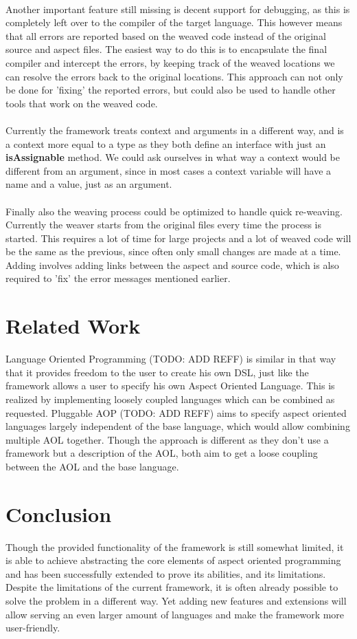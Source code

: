 \documentclass[a4paper]{report}
\begin{document}
\\
Another important feature still missing is decent support for debugging, as this is completely left over to the compiler of the target language. This however means that all errors are reported based on the weaved code instead of the original source and aspect files. The easiest way to do this is to encapsulate the final compiler and intercept the errors, by keeping track of the weaved locations we can resolve the errors back to the original locations. This approach can not only be done for 'fixing' the reported errors, but could also be used to handle other tools that work on the weaved code.\\
\\
Currently the framework treats context and arguments in a different way, and is a context more equal to a type as they both define an interface with just an \textbf{isAssignable} method. We could ask ourselves in what way a context would be different from an argument, since in most cases a context variable will have a name and a value, just as an argument.\\
\\
Finally also the weaving process could be optimized to handle quick re-weaving. Currently the weaver starts from the original files every time the process is started. This requires a lot of time for large projects and a lot of weaved code will be the same as the previous, since often only small changes are made at a time. Adding involves adding links between the aspect and source code, which is also required to 'fix' the error messages mentioned earlier.

\chapter{Related Work}
Language Oriented Programming (TODO: ADD REFF) is similar in that way that it provides freedom to the user to create his own DSL, just like the framework allows a user to specify his own Aspect Oriented Language. This is realized by implementing loosely coupled languages which can be combined as requested. Pluggable AOP (TODO: ADD REFF) aims to specify aspect oriented languages largely independent of the base language, which would allow combining multiple AOL together.  Though the approach is different as they don't use a framework but a description of the AOL, both aim to get a loose coupling between the AOL and the base language. 


\chapter{Conclusion}
Though the provided functionality of the framework is still somewhat limited, it is able to achieve abstracting the core elements of aspect oriented programming and has been successfully extended to prove its abilities, and its limitations. Despite the limitations of the current framework, it is often already possible to solve the problem in a different way. Yet adding new features and extensions will allow serving an even larger amount of languages and make the framework more user-friendly.
\end{document}
